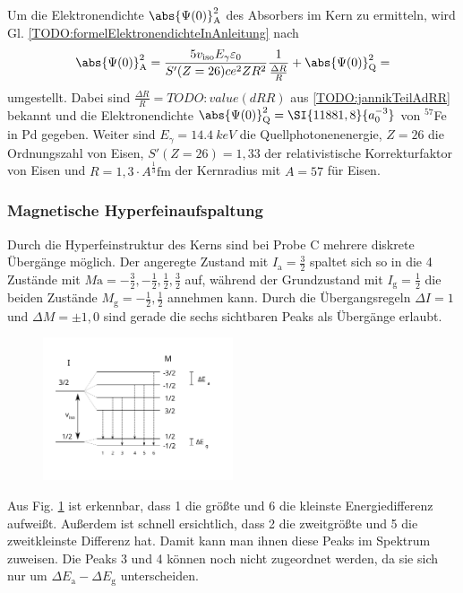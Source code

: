 Um die Elektronendichte $\abs{\Psi(0)}^2_\text{A}$ des Absorbers im Kern zu ermitteln, wird Gl. \ref{TODO:formelElektronendichteInAnleitung} nach
\begin{equation}
	\abs{\Psi(0)}^2_\text{A} = \frac{5 v_\text{iso} E_\gamma \varepsilon_0}{S'(Z = 26) c e^2 Z R^2} \frac{1}{\frac{\Delta R}{R}} + \abs{\Psi(0)}^2_\text{Q} = 
\end{equation}
umgestellt.
Dabei sind $\frac{\Delta R}{R} = TODO:value(dRR)$ aus \ref{TODO:jannikTeilAdRR} bekannt und die Elektronendichte $\abs{\Psi(0)}^2_\text{Q} = \SI{11881,8}{a_0^{-3}}$ von $^57$Fe in Pd gegeben.
Weiter sind $E_\gamma = \SI{14,4}{keV}$ die Quellphotonenenergie, $Z=26$ die Ordnungszahl von Eisen,
    $S'(Z = 26) = 1,33$ der relativistische Korrekturfaktor von Eisen und $R = 1,3 \cdot A^\frac{1}{3} \si{\femto\meter}$ der Kernradius mit $A=57$ für Eisen.

\subsubsection{Magnetische Hyperfeinaufspaltung}

Durch die Hyperfeinstruktur des Kerns sind bei Probe C mehrere diskrete Übergänge möglich.
Der angeregte Zustand mit $I_\text{a} = \frac{3}{2}$ spaltet sich so in die 4 Zustände mit $M\text{a} = -\frac{3}{2}, -\frac{1}{2}, \frac{1}{2}, \frac{3}{2}$ auf,
	während der Grundzustand mit $I_\text{g} = \frac{1}{2}$ die beiden Zustände $M_\text{g} = -\frac{1}{2}, \frac{1}{2}$ annehmen kann.
Durch die Übergangsregeln $\Delta I = 1$ und $\Delta M = \pm 1, 0$ sind gerade die sechs sichtbaren Peaks als Übergänge erlaubt.

\begin{figure}[ht]
	\centering
	\includegraphics[width=0.5\textwidth]{img/transition.svg}
	\caption{}
	\label{fig:transition}
\end{figure}

\noindent Aus Fig. \ref{fig:transition} ist erkennbar, dass 1 die größte und 6 die kleinste Energiedifferenz aufweißt.
Außerdem ist schnell ersichtlich, dass 2 die zweitgrößte und 5 die zweitkleinste Differenz hat.
Damit kann man ihnen diese Peaks im Spektrum zuweisen.
Die Peaks 3 und 4 können noch nicht zugeordnet werden, da sie sich nur um $\Delta E_\text{a} - \Delta E_\text{g}$ unterscheiden.

